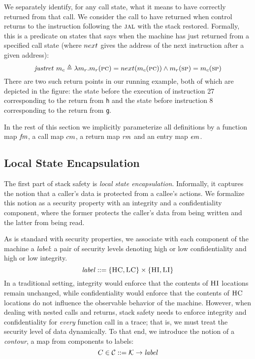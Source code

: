 \documentclass[acmsmall,review,anonymous]{acmart}\settopmatter{printfolios=true,printccs=false,printacmref=false}
\begin{document}
{We separately identify, for any call state, what it means to have 
correctly returned from that call. We consider the call to have
returned when control returns to the instruction following
the $\textsc{jal}$ with the stack restored. Formally, this is a predicate on
states that says when the machine has just returned from a specified call state
(where $next$ gives the address of the next instruction after a given address):
\[%
    \ret{\mach_c} \triangleq  \lambda \mach_r . \mach_r(\PCname) =
    \nextPC(\mach_c(\PCname)) \land  \mach_r(\SP) = \mach_c(\SP)
\]
There are two such return points in our running example, both of which
are depicted in the figure: the state before the execution of
instruction 27 corresponding to the return from {\tt h} and the state
before instruction 8 corresponding to the return from {\tt g}.

\medskip

In the rest of this section we implicitly parameterize all
definitions by a function map $\mathit{fm}$, a call map $cm$, a return
map $\mathit{rm}$ and an entry map $\mathit{em}$.

\subsection{Local State Encapsulation}
\label{sec:lse}

The first part of stack safety is {\em local state encapsulation}.
Informally, it captures the notion that a caller's data is
protected from a callee's actions. We formalize this notion
as a security property with an integrity and a confidentiality
component, where the former protects the caller's data from being
written and the latter from being read.

As is standard with security properties, we associate with each
component of the machine a {\em label}: a pair of security levels
denoting high or low confidentiality and high or low integrity.
%
\[\mathit{label} ::= \{\textsc{HC},\textsc{LC}\} \times \{\textsc{HI},\textsc{LI}\}\]
%
In a traditional setting, integrity would enforce that the contents of
$\textsc{HI}$ locations remain unchanged, while confidentiality would
enforce that the contents of $\textsc{HC}$ locations do not influence the
observable behavior of the machine. However, when dealing with nested
calls and returns, stack safety needs to enforce integrity and
confidentiality for {\em every} function call in a trace; that is, we
must treat the security level of data dynamically.
%
To that end, we introduce the notion of a {\em contour}, a map from
components to labels:
%
\[C \in {\mathcal C} ::= {\mathcal K} \rightarrow \mathit{label}\]

}
\end{document}
